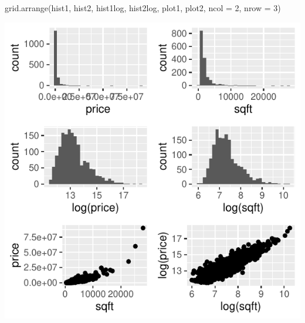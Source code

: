 \documentclass[
  letterpaper,
  DIV=11,
  numbers=noendperiod]{scrartcl}
\newenvironment{Shaded}{\begin{snugshade}}{\end{snugshade}}
\newcommand{\AttributeTok}[1]{\textcolor[rgb]{0.40,0.45,0.13}{#1}}
\newcommand{\DecValTok}[1]{\textcolor[rgb]{0.68,0.00,0.00}{#1}}
\newcommand{\FunctionTok}[1]{\textcolor[rgb]{0.28,0.35,0.67}{#1}}
\newcommand{\NormalTok}[1]{\textcolor[rgb]{0.00,0.23,0.31}{#1}}
\begin{document}
\begin{tcolorbox}
\begin{Shaded}
\begin{Highlighting}[]
\FunctionTok{grid.arrange}\NormalTok{(hist1, hist2, hist1log, hist2log, plot1, plot2,}
             \AttributeTok{ncol =} \DecValTok{2}\NormalTok{, }\AttributeTok{nrow =} \DecValTok{3}\NormalTok{)}
\end{Highlighting}
\end{Shaded}

\begin{center}
\includegraphics{about_files/figure-pdf/unnamed-chunk-3-1.pdf}
\end{center}

\end{tcolorbox}
\end{document}
